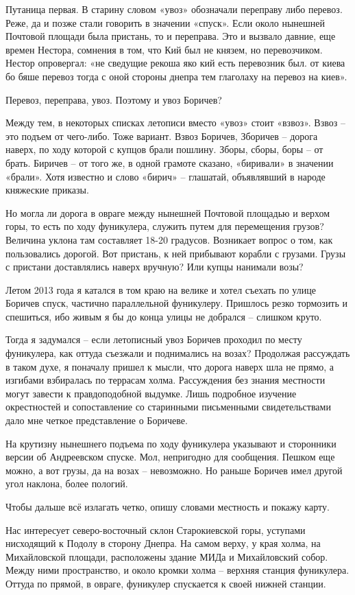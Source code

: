 Путаница первая. В старину словом «увоз» обозначали переправу либо перевоз. Реже, да и позже стали говорить в значении «спуск». Если около нынешней Почтовой площади была пристань, то и переправа. Это и вызвало давние, еще времен Нестора, сомнения в том, что Кий был не князем, но перевозчиком. Нестор опровергал: «не сведущие рекоша яко кий есть перевозник был. от киева бо бяше перевоз тогда с оной стороны днепра тем глаголаху на перевоз на киев».

Перевоз, переправа, увоз. Поэтому и увоз Боричев?

Между тем, в некоторых списках летописи вместо «увоз» стоит «взвоз». Взвоз – это подъем от чего-либо. Тоже вариант. Взвоз Боричев, Зборичев – дорога наверх, по ходу которой с купцов брали пошлину. Зборы, сборы, боры – от брать. Биричев – от того же, в одной грамоте сказано, «биривали» в значении «брали». Хотя известно и слово «бирич» – глашатай, объявлявший в народе княжеские приказы.

Но могла ли дорога в овраге между нынешней Почтовой площадью и верхом горы, то есть по ходу фуникулера, служить путем для перемещения грузов? Величина уклона там составляет 18-20 градусов. Возникает вопрос о том, как пользовались дорогой. Вот пристань, к ней прибывают корабли с грузами. Грузы с пристани доставлялись наверх вручную? Или купцы нанимали возы?

Летом 2013 года я катался в том краю на велике и хотел съехать по улице Боричев спуск, частично параллельной фуникулеру. Пришлось резко тормозить и спешиться, ибо живым я бы до конца улицы не добрался – слишком круто.

Тогда я задумался – если летописный увоз Боричев проходил по месту фуникулера, как оттуда съезжали и поднимались на возах? Продолжая рассуждать в таком духе, я поначалу пришел к мысли, что дорога наверх шла не прямо, а изгибами взбиралась по террасам холма. Рассуждения без знания местности могут завести к правдоподобной выдумке. Лишь подробное изучение окрестностей и сопоставление со старинными письменными свидетельствами дало мне четкое представление о Боричеве.

На крутизну нынешнего подъема по ходу фуникулера указывают и сторонники версии об Андреевском спуске. Мол, непригодно для сообщения. Пешком еще можно, а вот грузы, да на возах – невозможно. Но раньше Боричев имел другой угол наклона, более пологий.

Чтобы дальше всё излагать четко, опишу словами местность и покажу карту.

Нас интересует северо-восточный склон Старокиевской горы, уступами нисходящий к Подолу в сторону Днепра. На самом верху, у края холма, на Михайловской площади, расположены здание МИДа и Михайловский собор. Между ними пространство, и около кромки холма – верхняя станция фуникулера. Оттуда по прямой, в овраге, фуникулер спускается к своей нижней станции.

